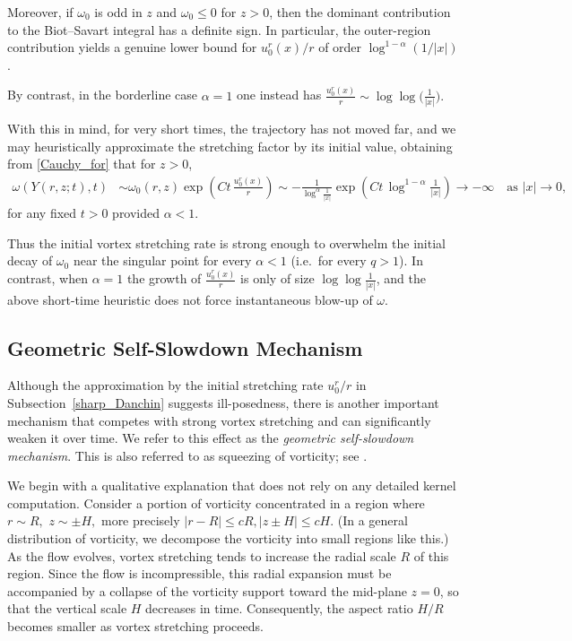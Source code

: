 \documentclass[reqno,11pt]{amsart}
\begin{document}
Moreover, if $\omega_0$ is odd in $z$ and $\omega_0\leq0$ for $z>0$, then 
the dominant contribution to the Biot--Savart integral has a definite sign. In particular, the outer-region contribution yields  a genuine lower bound for $u_0^r (x)/r$ of order $\log^{1-\alpha}(1/|x|)$.

By contrast, in the borderline case $\alpha=1$ one instead has $\frac{u^r_0(x)}{r}\sim \log\log\!\Big(\frac1{|x|}\Big).$

With this in mind, for very short times, the trajectory has not moved far, and we may heuristically
approximate the stretching factor by its initial value, obtaining from \eqref{Cauchy_for} that for $z>0$,
\begin{align*}
    \omega(Y(r,z;t),t)
    &\sim
    \omega_0(r,z)\exp\!\left(Ct\,\frac{u^r_0(x)}{r}\right)
    \sim
    -\frac{1}{\log^\alpha\!\frac1{|x|}}
    \exp\!\left(Ct\,\log^{1-\alpha}\!\frac1{|x|}\right)
    \to -\infty
    \quad \text{as }|x|\to 0,
\end{align*}
for any fixed $t>0$ provided $\alpha<1$.

Thus the initial vortex stretching rate is strong enough to overwhelm the
initial decay of $\omega_0$ near the singular point for every $\alpha<1$ (i.e.\ for every
$q>1$). In contrast, when $\alpha=1$ the growth of $\frac{u^r_0(x)}{r}$ is only of size
$\log\log \frac1{|x|}$, and the above short-time heuristic does not force instantaneous
blow-up  of $\omega$.











\subsection{Geometric Self-Slowdown Mechanism}
\label{geo_ss_mc}

Although the approximation by the initial stretching rate $u_0^r/r$ in
Subsection~\ref{sharp_Danchin} suggests ill-posedness, there is another
important mechanism that competes with strong vortex stretching and can
significantly weaken it over time. We refer to this effect as the
\emph{geometric self-slowdown mechanism}. 
This is also referred to as squeezing of vorticity; see \cite[p.~8]{KimJeong22}.

We begin with a qualitative explanation that does not rely on any detailed
kernel computation. Consider a portion of vorticity concentrated in a region
where
$
r \sim R, \,\, z \sim \pm H,$ more precisely $|r-R|\leq cR, |z\pm H|\leq cH $. (In a general distribution of vorticity, we decompose the vorticity into small regions like this.)
As the flow evolves,
vortex stretching tends to increase the radial scale $R$ of this region.
Since the flow is incompressible, this radial expansion must be accompanied
by a collapse of the vorticity support toward the mid-plane $z=0$, so that
the vertical scale $H$ decreases in time. Consequently, the aspect ratio
$H/R$ becomes smaller as vortex stretching proceeds.
\end{document}
